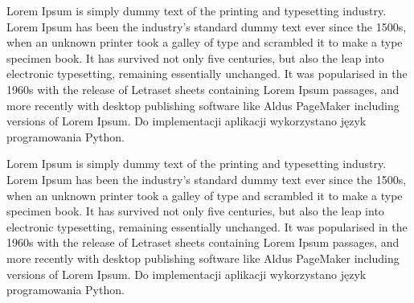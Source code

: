 \documentclass{article}
\begin{document}
Lorem Ipsum is simply dummy text of the printing and typesetting industry. Lorem Ipsum has been the industry's standard dummy text ever since the 1500s, when an unknown printer took a galley of type and scrambled it to make a type specimen book. It has survived not only five centuries, but also the leap into electronic typesetting, remaining essentially unchanged. It was popularised in the 1960s with the release of Letraset sheets containing Lorem Ipsum passages, and more recently with desktop publishing software like Aldus PageMaker including versions of Lorem Ipsum. Do implementacji aplikacji wykorzystano język programowania Python.

Lorem Ipsum is simply dummy text of the printing and typesetting industry. Lorem Ipsum has been the industry's standard dummy text ever since the 1500s, when an unknown printer took a galley of type and scrambled it to make a type specimen book. It has survived not only five centuries, but also the leap into electronic typesetting, remaining essentially unchanged. It was popularised in the 1960s with the release of Letraset sheets containing Lorem Ipsum passages, and more recently with desktop publishing software like Aldus PageMaker including versions of Lorem Ipsum. Do implementacji aplikacji wykorzystano język programowania Python.

  
\end{document}
